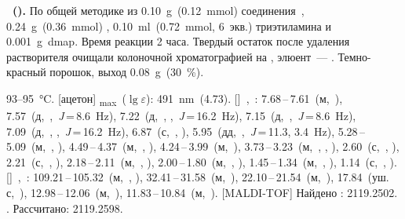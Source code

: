 \textbf{~().} 
По общей методике из \SI{0.10}{\gram}~(\SI{0.12}{\milli\mole}) соединения~, \SI{0.24}{\gram}~(\SI{0.36}{\milli\mole}) , \SI{0.10}{\milli\litre}~(\SI{0.72}{\milli\mole}, 6~экв.) триэтиламина и \SI{0.001}{\gram}~\ac{dmap}.
Время реакции 2 часа. Твердый остаток после удаления растворителя очищали колоночной хроматографией на , элюент~--- .
Темно-красный порошок, выход \SI{0.08}{\gram}~(\SI{30}{\percent}).
\begin{experimental}
     93--\SI{95}{\celsius}.
    [ацетон] \chemlambda\textsubscript{max}~($\lg \varepsilon$): \SI{491}{\nano\metre}~(4.73).
    []~\chemdelta,~\si{\ppm}: 7.68\,--\,7.61~(м,~), 7.57~(д,~,~\textit{J}\,=\,8.6~\si{\hertz}), 7.22~(д,~, ,~\textit{J}\,=\,16.2~\si{\hertz}), 7.15~(д,~,~\textit{J}\,=\,8.6~\si{\hertz}), 7.09~(д,~, ,~\textit{J}\,=\,16.2~\si{\hertz}), 6.87~(с,~, ), 5.95~(дд,~,~\textit{J}\,=\,11.3, 3.4~\si{\hertz}), 5.28\,--\,5.09~(м,~, ), 4.49\,--\,4.37~(м,~, ), 4.24\,--\,3.99~(м,~), 3.73\,--\,3.23~(м,~, , ), 2.60~(с,~, ), 2.21~(с,~, ), 2.18\,--\,2.11~(м,~, ), 2.00\,--\,1.80~(м,~, ), 1.45\,--\,1.34~(м,~, ), 1.14~(с,~, ).
    []~\chemdelta,~\si{\ppm}: 109.21\,--\,105.32~(м,~, ), 32.41\,--\,31.58~(м,~), 22.10\,--\,21.54~(м,~), 17.84~(уш. с,~), 12.98\,--\,12.06~(м,~), 11.83\,--\,10.84~(м,~).
    [MALDI-TOF] Найдено \ce{[M - H]-}: \num{2119.2502}. . Рассчитано: \ce{[M - H]} \num{2119.2598}.
\end{experimental}

